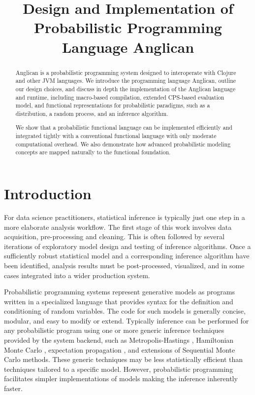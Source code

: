 \documentclass[preprint]{sigplanconf}
\title{Design and Implementation of Probabilistic Programming Language Anglican}
\begin{document}
\maketitle

\begin{abstract}
    Anglican is a probabilistic programming system designed to interoperate
    with Clojure and other JVM languages. We introduce the
    programming language Anglican, outline our design choices,
    and discuss in depth the implementation of the Anglican language
    and runtime, including macro-based compilation, extended
    CPS-based evaluation model, and functional representations for
    probabilistic paradigms, such as a distribution,
    a random process, and an inference algorithm.

    We show that a probabilistic functional language can be
    implemented efficiently and integrated tightly with a
    conventional functional language with only moderate
    computational overhead. We also demonstrate how advanced
    probabilistic modeling concepts are mapped naturally
    to the functional foundation.
\end{abstract}

\section{Introduction}
\label{sec:intro}

For data science practitioners, statistical inference is typically
just one step in a more elaborate analysis workflow. The first stage
of this work involves data acquisition, pre-processing and cleaning.
This is often followed by several iterations of exploratory model
design and testing of inference algorithms. Once a sufficiently
robust statistical model and a corresponding inference algorithm have
been identified, analysis results must be post-processed, visualized,
and in some cases integrated into a wider production system.

Probabilistic programming systems \cite{GMR+08,MSP14,WVM14,GS15}
represent generative models as programs written in a specialized
language that provides syntax for the definition and conditioning of
random variables. The code for such models is generally concise,
modular, and easy to modify or extend. Typically inference can be
performed for any probabilistic program using one or more generic
inference techniques provided by the system backend, such as
Metropolis-Hastings \cite{WSG11,MSP14,YHG14}, Hamiltonian Monte Carlo
\cite{SDT14}, expectation propagation \cite{MWG+10}, and extensions
of Sequential Monte Carlo \cite{WVM14,MYM+15,PWD+14} methods.
These generic techniques may be less statistically efficient
than techniques tailored to a specific model. However,
probabilistic programming facilitates simpler implementations of
models making the inference inherently faster.
\end{document}
